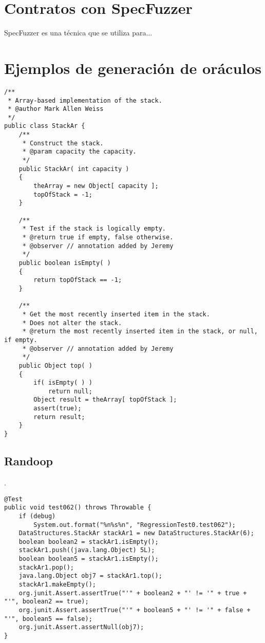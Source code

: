 \section{Contratos con SpecFuzzer}

SpecFuzzer es una técnica que se utiliza para...

\section{Ejemplos de generación de oráculos}

\begin{lstlisting}[style=javastyle, caption=Ejemplo StackAr.top, label=lst:top]
/**
 * Array-based implementation of the stack.
 * @author Mark Allen Weiss
 */
public class StackAr {
    /**
     * Construct the stack.
     * @param capacity the capacity.
     */
    public StackAr( int capacity )
    {
        theArray = new Object[ capacity ];
        topOfStack = -1;
    }

    /**
     * Test if the stack is logically empty.
     * @return true if empty, false otherwise.
     * @observer // annotation added by Jeremy
     */
    public boolean isEmpty( )
    {
        return topOfStack == -1;
    }

    /**
     * Get the most recently inserted item in the stack.
     * Does not alter the stack.
     * @return the most recently inserted item in the stack, or null, if empty.
     * @observer // annotation added by Jeremy
     */
    public Object top( )
    {
        if( isEmpty( ) )
            return null;
        Object result = theArray[ topOfStack ];
    	assert(true);
        return result;
    }
}
\end{lstlisting}


\subsection{Randoop}.


\begin{lstlisting}[style=javastyle, caption=Aserción generada con Randoop, label=lst:randoop]
@Test
public void test062() throws Throwable {
    if (debug)
        System.out.format("%n%s%n", "RegressionTest0.test062");
    DataStructures.StackAr stackAr1 = new DataStructures.StackAr(6);
    boolean boolean2 = stackAr1.isEmpty();
    stackAr1.push((java.lang.Object) 5L);
    boolean boolean5 = stackAr1.isEmpty();
    stackAr1.pop();
    java.lang.Object obj7 = stackAr1.top();
    stackAr1.makeEmpty();
    org.junit.Assert.assertTrue("'" + boolean2 + "' != '" + true + "'", boolean2 == true);
    org.junit.Assert.assertTrue("'" + boolean5 + "' != '" + false + "'", boolean5 == false);
    org.junit.Assert.assertNull(obj7);
}
\end{lstlisting}



